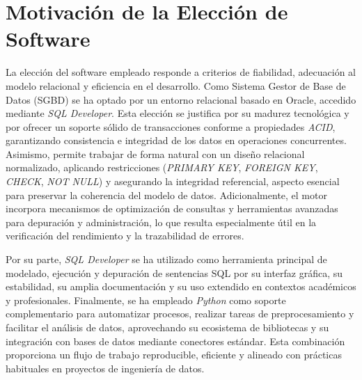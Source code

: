 \chapter{Motivación de la Elección de Software}

La elección del software empleado responde a criterios de fiabilidad, adecuación al modelo relacional y eficiencia en el desarrollo. Como Sistema Gestor de Base de Datos (SGBD) se ha optado por un entorno relacional basado en Oracle, accedido mediante \textit{SQL Developer}. Esta elección se justifica por su madurez tecnológica y por ofrecer un soporte sólido de transacciones conforme a propiedades \textit{ACID}, garantizando consistencia e integridad de los datos en operaciones concurrentes. Asimismo, permite trabajar de forma natural con un diseño relacional normalizado, aplicando restricciones (\textit{PRIMARY KEY}, \textit{FOREIGN KEY}, \textit{CHECK}, \textit{NOT NULL}) y asegurando la integridad referencial, aspecto esencial para preservar la coherencia del modelo de datos. Adicionalmente, el motor incorpora mecanismos de optimización de consultas y herramientas avanzadas para depuración y administración, lo que resulta especialmente útil en la verificación del rendimiento y la trazabilidad de errores.

Por su parte, \textit{SQL Developer} se ha utilizado como herramienta principal de modelado, ejecución y depuración de sentencias SQL por su interfaz gráfica, su estabilidad, su amplia documentación y su uso extendido en contextos académicos y profesionales. Finalmente, se ha empleado \textit{Python} como soporte complementario para automatizar procesos, realizar tareas de preprocesamiento y facilitar el análisis de datos, aprovechando su ecosistema de bibliotecas y su integración con bases de datos mediante conectores estándar. Esta combinación proporciona un flujo de trabajo reproducible, eficiente y alineado con prácticas habituales en proyectos de ingeniería de datos.
